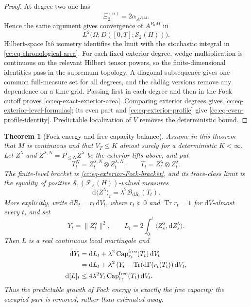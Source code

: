 \documentclass[10pt,reqno]{amsart}
\theoremstyle{plain}
\newtheorem{theorem}{Theorem}[section]
\theoremstyle{definition}
\theoremstyle{remark}
\begin{document}
\begin{proof}
At degree two one has
\[
 \Xi_2^{(n)}=2\alpha_{A^{P_nM}}.
\]
Hence the same argument gives convergence of $A^{P_nM}$ in
\[
 L^2\bigl(\Omega;D([0,T];\mathcal S_2(H))\bigr).
\]
Hilbert-space It\^o isometry identifies the limit with the stochastic
integral in \eqref{cc:eq-chronological-area}.  For each fixed exterior
degree, wedge multiplication is continuous on the relevant Hilbert tensor
powers, so the finite-dimensional identities pass in the supremum topology.
A diagonal subsequence gives one common full-measure set for all degrees,
and the c\`adl\`ag versions remove any dependence on a time grid.  Passing
first in each degree and then in the Fock cutoff proves
\eqref{cc:eq-exact-exterior-area}.  Comparing exterior degrees gives
\eqref{cc:eq-exterior-level-formulas}; its even part and
\eqref{cc:eq-exterior-profile} give
\eqref{cc:eq-even-profile-identity}.  Predictable localization of \(V\)
removes the deterministic bound.
\end{proof}

\begin{theorem}[Fock energy and free-capacity balance]
\label{cc:thm-Fock-free-capacity-balance}
Assume in this theorem that \(M\) is continuous and that \(V_T\leq K\)
almost surely for a deterministic \(K<\infty\).  Let \(Z^\lambda\) and
\(Z^{\lambda,N}=P_{\leq N}Z^\lambda\) be the exterior lifts above, and put
\[
 T_t^N=Z_t^{\lambda,N}\otimes Z_t^{\lambda,N},
 \qquad T_t=Z_t^\lambda\otimes Z_t^\lambda.
\]
The finite-level bracket is \eqref{cc:eq-exterior-Fock-bracket}, and its
trace-class limit is the equality of positive
\(\mathcal S_1(\mathcal F_{\wedge}(H))\)-valued measures
\begin{equation}
 \mathrm d\langle Z^\lambda\rangle_t
 =\lambda^2\mathcal B_{\mathrm dR_t}(T_t).
 \label{cc:eq-Fock-bracket-limit}
\end{equation}
More explicitly, write
\(
 \mathrm dR_t=r_t\,\mathrm dV_t
\), where \(r_t\succeq0\) and
\(\operatorname{Tr}r_t=1\) for \(\mathrm dV\)-almost every \(t\), and set
\[
 Y_t=\|Z_t^\lambda\|^2,
 \qquad
 L_t=2\int_0^t
      \langle Z_s^\lambda,\mathrm dZ_s^\lambda\rangle.
\]
Then \(L\) is a real continuous local martingale and
\begin{align}
 \mathrm dY_t
 &=\mathrm dL_t
   +\lambda^2\operatorname{Cap}^{\mathrm{free}}_{r_t}(T_t)
      \,\mathrm dV_t \notag\\
 &=\mathrm dL_t
   +\lambda^2\left(
      Y_t-\operatorname{Tr}(\mathrm d\Gamma(r_t)T_t)
     \right)\mathrm dV_t,
 \label{cc:eq-Fock-free-energy}\\
 \mathrm d[L]_t
 &\leq4\lambda^2Y_t
   \operatorname{Cap}^{\mathrm{free}}_{r_t}(T_t)
   \,\mathrm dV_t.
 \label{cc:eq-Fock-free-energy-bracket}
\end{align}
Thus the predictable growth of Fock energy is exactly the free capacity;
the occupied part is removed, rather than estimated away.
\end{theorem}
\end{document}
